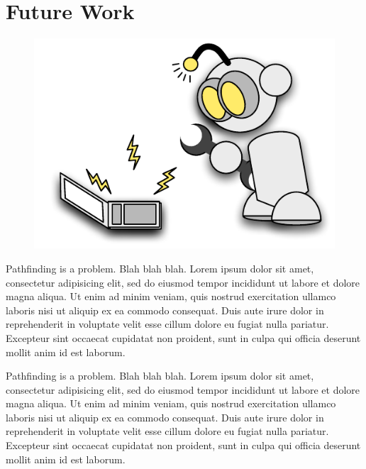 \section{Future Work}
 \begin{figure}
		\includegraphics[width=0.30\columnwidth, trim = 10mm 10mm 10mm
10mm]{diagrams/robot_mechanic.pdf}
 \end{figure}
Pathfinding is a problem. Blah blah blah.
Lorem ipsum dolor sit amet, consectetur adipisicing elit, sed do eiusmod
tempor incididunt ut labore et dolore magna aliqua. Ut enim ad minim
veniam, quis nostrud exercitation ullamco laboris nisi ut aliquip ex ea
commodo consequat. Duis aute irure dolor in reprehenderit in voluptate
velit esse cillum dolore eu fugiat nulla pariatur. Excepteur sint occaecat
cupidatat non proident, sunt in culpa qui officia deserunt mollit anim
id est laborum.



Pathfinding is a problem. Blah blah blah.
Lorem ipsum dolor sit amet, consectetur adipisicing elit, sed do eiusmod
tempor incididunt ut labore et dolore magna aliqua. Ut enim ad minim
veniam, quis nostrud exercitation ullamco laboris nisi ut aliquip ex ea
commodo consequat. Duis aute irure dolor in reprehenderit in voluptate
velit esse cillum dolore eu fugiat nulla pariatur. Excepteur sint occaecat
cupidatat non proident, sunt in culpa qui officia deserunt mollit anim
id est laborum.
